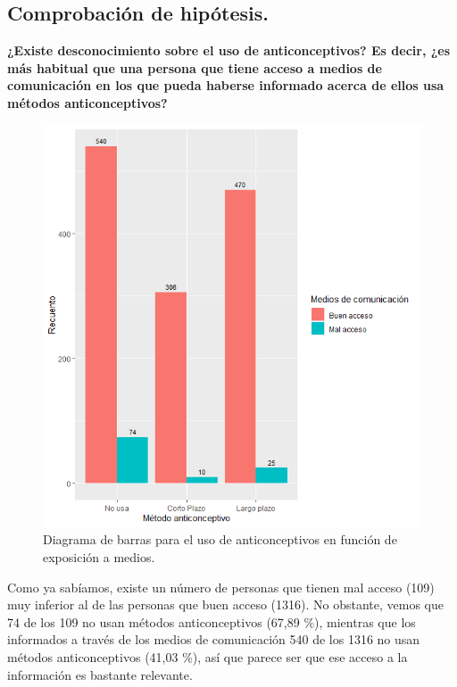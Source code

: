 \documentclass[a4paper,12pt, oneside]{book}
\begin{document}
\subsection{Comprobación de hipótesis.}

\textbf{¿Existe desconocimiento sobre el uso de anticonceptivos? Es decir, ¿es más habitual que una persona que tiene acceso a medios de comunicación en los que pueda haberse informado acerca de ellos usa métodos anticonceptivos?}\\

\begin{figure}[H]
\centering
\includegraphics[scale=0.7]{images/hipo1.png}
\caption{Diagrama de barras para el uso de anticonceptivos en función de exposición a medios.}
\end{figure}

Como ya sabíamos, existe un número de personas que tienen mal acceso (109) muy inferior al de las personas que buen acceso (1316). No obstante, vemos que 74 de los 109 no usan métodos anticonceptivos (67,89 \%), mientras que los informados a través de los medios de comunicación 540 de los 1316 no usan métodos anticonceptivos (41,03 \%), así que parece ser que ese acceso a la información es bastante relevante.\\
\end{document}
